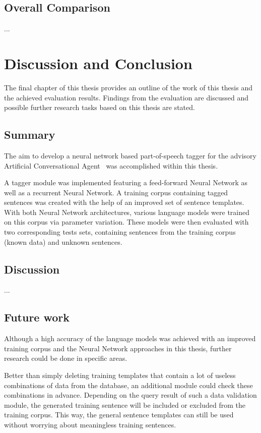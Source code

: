 \section{Overall Comparison}\label{c.evaluation.comparison}
...

\chapter{Discussion and Conclusion}\label{c.conclusion}
The final chapter of this thesis provides an outline of the work of this thesis and the achieved evaluation results. Findings from the evaluation are discussed and possible further research tasks based on this thesis are stated.

\section{Summary}\label{c.conclusion.summary}
The aim to develop a neural network based part-of-speech tagger for the advisory Artificial Conversational Agent \Alex\ was accomplished within this thesis.

A tagger module was implemented featuring a feed-forward Neural Network as well as a recurrent Neural Network. A training corpus containing tagged sentences was created with the help of an improved set of sentence templates. With both Neural Network architectures, various language models were trained on this corpus via parameter variation. These models were then evaluated with two corresponding tests sets, containing sentences from the training corpus (known data) and unknown sentences.

\section{Discussion}\label{c.conclusion.discussion}
...

\section{Future work}\label{c.conclusion.future}
Although a high accuracy of the language models was achieved with an improved training corpus and the Neural Network approaches in this thesis, further research could be done in specific areas.

Better than simply deleting training templates that contain a lot of useless combinations of data from the database, an additional module could check these combinations in advance. Depending on the query result of such a data validation module, the generated training sentence will be included or excluded from the training corpus. This way, the general sentence templates can still be used without worrying about meaningless training sentences.

